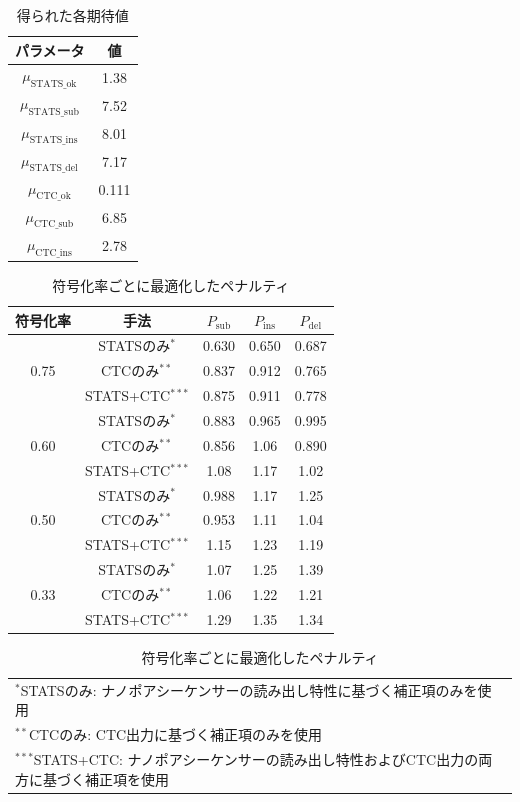 \documentclass[sotsuron]{kuee}
\begin{document}
\begin{table}
  \centering
  \caption{得られた各期待値}
  \label{tab:appendix_mu_values}
  \begin{tabular}{c|c}
    \hline
    パラメータ & 値 \\
    \hline
    $\mu_{\mathrm{STATS}\_\mathrm{ok}}$ & 1.38 \\
    $\mu_{\mathrm{STATS}\_\mathrm{sub}}$ & 7.52 \\
    $\mu_{\mathrm{STATS}\_\mathrm{ins}}$ & 8.01 \\
    $\mu_{\mathrm{STATS}\_\mathrm{del}}$ & 7.17 \\
    $\mu_{\mathrm{CTC}\_\mathrm{ok}}$ & 0.111 \\
    $\mu_{\mathrm{CTC}\_\mathrm{sub}}$ & 6.85 \\
    $\mu_{\mathrm{CTC}\_\mathrm{ins}}$ & 2.78 \\
    \hline
  \end{tabular}
\end{table}

\begin{table}
  \centering
  \caption{符号化率ごとに最適化したペナルティ}
  \label{tab:appendix_params_p}
  \footnotesize
  \begin{tabular}{c|c|ccc}
    \hline
    符号化率 & 手法 & $P_{\mathrm{sub}}$ & $P_{\mathrm{ins}}$ & $P_{\mathrm{del}}$ \\
    \hline
    \multirow{3}{*}{0.75} & STATSのみ$^{*}$ & 0.630 & 0.650 & 0.687 \\
    & CTCのみ$^{**}$ & 0.837 & 0.912 & 0.765 \\
    & STATS+CTC$^{***}$ & 0.875 & 0.911 & 0.778 \\
    \hline
    \multirow{3}{*}{0.60} & STATSのみ$^{*}$ & 0.883 & 0.965 & 0.995 \\
    & CTCのみ$^{**}$ & 0.856 & 1.06 & 0.890 \\
    & STATS+CTC$^{***}$ & 1.08 & 1.17 & 1.02 \\
    \hline
    \multirow{3}{*}{0.50} & STATSのみ$^{*}$ & 0.988 & 1.17 & 1.25 \\
    & CTCのみ$^{**}$ & 0.953 & 1.11 & 1.04 \\
    & STATS+CTC$^{***}$ & 1.15 & 1.23 & 1.19 \\
    \hline
    \multirow{3}{*}{0.33} & STATSのみ$^{*}$ & 1.07 & 1.25 & 1.39 \\
    & CTCのみ$^{**}$ & 1.06 & 1.22 & 1.21 \\
    & STATS+CTC$^{***}$ & 1.29 & 1.35 & 1.34 \\
    \hline
  \end{tabular}
  
  \small
  \vspace{0.3cm}
  
  \noindent
  \begin{tabular}{@{}l@{}}
    $^{*}$STATSのみ: ナノポアシーケンサーの読み出し特性に基づく補正項のみを使用 \\
    $^{**}$CTCのみ: CTC出力に基づく補正項のみを使用 \\
    $^{***}$STATS+CTC: ナノポアシーケンサーの読み出し特性およびCTC出力の両方に基づく補正項を使用
  \end{tabular}
\end{table}
\end{document}
